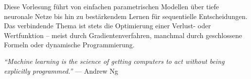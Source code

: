 \documentclass[11pt]{article}
\theoremstyle{csthm}
\theoremstyle{csdef}
\begin{document}
\bigskip

\noindent Diese Vorlesung führt von einfachen parametrischen Modellen über
tiefe neuronale Netze bis hin zu bestärkendem Lernen für sequentielle
Entscheidungen. Das verbindende Thema ist stets die Optimierung einer
Verlust- oder Wertfunktion -- meist durch Gradientenverfahren, manchmal
durch geschlossene Formeln oder dynamische Programmierung.

\bigskip

\noindent\textit{``Machine learning is the science of getting computers
to act without being explicitly programmed.''} --- Andrew Ng
\end{document}
